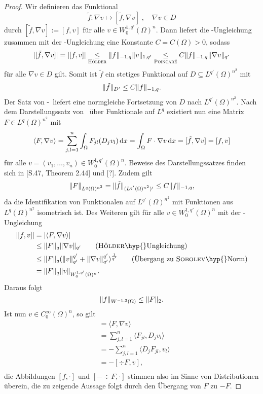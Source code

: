 \begin{proof}
  Wir definieren das Funktional
  $$
  \tilde f \colon \nabla v \mapsto [\tilde f, \nabla v]\;, \quad \nabla v \in D
  $$
  durch $[\tilde f, \nabla v] := [f, v]$ für alle $v \in W_0^{1,q'}(\Omega)^n$.
  Dann liefert die \hoelder\hyp{}Ungleichung zusammen mit der \poincare\hyp{}Ungleichung eine Konstante $C = C(\Omega) > 0$, sodass 
  $$
  |[\tilde f, \nabla v]| 
  = |[f, v]| 
  \underset{\hoelder}{\leq} \norm{f}_{-1,q} \norm{v}_{1,q'}
  \underset{\poincare}{\leq} C \norm{f}_{-1,q} \norm{\nabla v }_{q'}
  $$
  für alle $\nabla v \in D$ gilt.
  Somit ist $\tilde f$ ein stetiges Funktional auf $D \subseteq L^{q'}(\Omega)^{n^2}$ mit 
  $$\norm{\tilde f}_{D'} \leq C\norm{f}_{-1,q}.$$
  Der Satz von \hahn\hyp{}\banach\ liefert eine normgleiche Fortsetzung von $D$ nach $L^{q'}(\Omega)^{n^2}$.
  Nach dem Darstellungssatz von \riesz\ über Funktionale auf $L^{q}$  existiert nun eine Matrix $F \in L^{q}(\Omega)^{n^2}$ mit
  $$
  \langle F, \nabla v \rangle
  = \sum_{j,l=1}^n \int_\Omega F_{jl}(D_j v_l) \d x
  = \int_\Omega F \cdot \nabla v \d x
  = [\tilde f, \nabla v] 
  = [f, v]
  $$
  für alle $v = (v_1,\dots,v_n) \in W_0^{1,q'}(\Omega)^n$.
  Beweise des Darstellungssatzes finden sich in \cite{adams2003sobolev}[S.47, Theorem 2.44] und \cite{werner2011fa}[?].
  Zudem gilt
  $$ \norm{F}_{L^q(\Omega)^{n^2}} = \norm{\tilde f}_{(L^{q'}(\Omega)^{n^2})'} \leq C \norm{f}_{-1,q},$$
  da die Identifikation von Funktionalen auf $L^{q'}(\Omega)^{n^2}$ mit Funktionen aus $L^q(\Omega)^{n^2}$ isometrisch ist.
  Des Weiteren gilt für alle $v \in W_0^{1,q'}(\Omega)^n$ mit der \hoelder\hyp{}Ungleichung
  \begin{align*}
    |[f,v]| 
    &= |\langle F, \nabla v\rangle|  \\
    &\leq \norm{F}_q \norm{\nabla v}_{q'}  \tag{\hoelder\hyp{}Ungleichung}\\
    &\leq \norm{F}_q (\norm{v}_{q'}^{q'} + \norm{\nabla v}_{q'}^{q'})^{\frac{1}{q'}} \tag{Übergang zu \sobolev\hyp{}Norm}\\
    &= \norm{F}_q \norm{v}_{W_0^{1,q'}(\Omega)^n}.
  \end{align*}
  Daraus folgt
  $$
  \norm{f}_{W^{-1,2}(\Omega)} \leq \norm{F}_2.
  $$
  Ist nun $v \in C_0^\infty(\Omega)^n$, so gilt
  \begin{align*}
    [f,v]
    &= \langle F, \nabla v\rangle \\
    &= \sum_{j,l=1}^n \langle F_{jl}, D_j v_l \rangle \\
    &= -\sum_{j,l=1}^n \langle D_j F_{jl}, v_l \rangle \\
    &= -[\div F, v], \\
  \end{align*}
  die Abbildungen $[f,\cdot]$ und $[-\div F, \cdot]$ stimmen also im Sinne von Distributionen überein, die zu zeigende Aussage folgt durch den Übergang von $F$ zu $-F$.
\end{proof}


